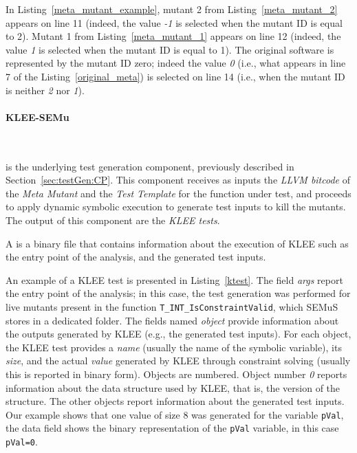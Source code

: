 In Listing~\ref{meta_mutant_example}, mutant 2 from Listing~\ref{meta_mutant_2} appears on line 11 (indeed, the value \emph{-1} is selected when the mutant ID is equal to 2). Mutant 1 from Listing~\ref{meta_mutant_1} appears on line 12 (indeed, the value \emph{1} is selected when the mutant ID is equal to 1). The original software is represented by the mutant ID zero; indeed the value \emph{0} (i.e., what appears in line 7 of the Listing~\ref{original_meta}) is selected on line 14 (i.e., when the mutant ID is neither \emph{2} nor \emph{1}).

\paragraph{KLEE-SEMu}\ 



 is the underlying test generation component, previously described in Section~\ref{sec:testGen:CP}. This component receives as inputs the \emph{LLVM bitcode} of the \emph{Meta Mutant} and the \emph{Test Template} for the function under test, and proceeds to apply dynamic symbolic execution to generate test inputs to kill the mutants. The output of this component are the \emph{KLEE tests}.

A  is a binary file that contains information about the execution of KLEE such as the entry point of the analysis, and the generated test inputs.


An example of a KLEE test is presented in Listing~\ref{ktest}. The field \emph{args} report the entry point of the analysis; in this case, the test generation was performed for live mutants present in the function \texttt{T\_INT\_Is\-Constraint\-Valid}, which SEMuS stores in a dedicated folder. The fields named \emph{object} provide information about the outputs generated by KLEE (e.g., the generated test inputs). 
For each object, the KLEE test provides a \emph{name} (usually the name of the symbolic variable), its \emph{size}, and the actual \emph{value} generated by KLEE through constraint solving (usually this is reported in binary form).
Objects are numbered. Object number \emph{0} reports information about the data structure used by KLEE, that is, the version of the structure. The other objects report information about the generated test inputs.
Our example shows that one value of size 8 was generated for the variable \texttt{pVal}, the data field shows the binary representation of the \texttt{pVal} variable, in this case \texttt{pVal=0}.

